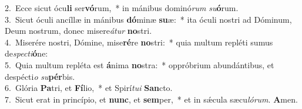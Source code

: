 {2.~}Ecce sicut ócu\textbf{li} ser\textbf{vó}rum,~* in mánibus dominó\textit{rum} \textit{su}\textbf{ó}rum.\\
{3.~}Sicut óculi ancíllæ in mánibus \textbf{dó}minæ \textbf{su}æ:~* ita óculi nostri ad Dóminum, Deum nostrum, donec misere\textit{á}\textit{tur} \textbf{no}stri.\\
{4.~}Miserére nostri, Dómine, mise\textbf{ré}re \textbf{no}stri:~* quia multum repléti sumus de\textit{spe}\textit{cti}\textbf{ó}ne:\\
{5.~}Quia multum repléta est \textbf{á}nima \textbf{no}stra:~* oppróbrium abundántibus, et despécti\textit{o} \textit{su}\textbf{pér}bis.\\
{6.~}Glória \textbf{Pa}tri, et \textbf{Fí}lio,~* et Spirí\textit{tu}\textit{i} \textbf{San}cto.\\
{7.~}Sicut erat in princípio, et \textbf{nunc}, et \textbf{sem}per,~* et in sǽcula sæcu\textit{ló}\textit{rum}. \textbf{A}men.\\
